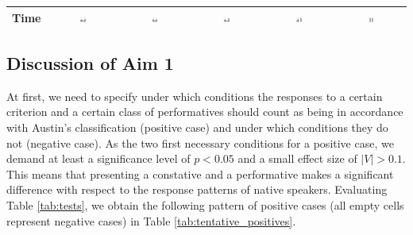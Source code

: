 \documentclass[egregdoesnotlikesansseriftitles,12pt]{scrartcl}
\begin{document}
\begin{landscape}
\begin{table}[]
{\begin{tabular}{lccccc}
Time         & \includegraphics[width=0.1\textwidth]{figures/beha_5.pdf}   & \includegraphics[width=0.1\textwidth]{figures/verd_5.pdf}   & \includegraphics[width=0.1\textwidth]{figures/exer_5.pdf}   & \includegraphics[width=0.1\textwidth]{figures/comm_5.pdf}   & \includegraphics[width=0.1\textwidth]{figures/expo_5.pdf}   \\
\hline
\end{tabular}}
\label{fig:bars}
\end{table}
\end{landscape}


\subsection{Discussion of Aim 1}
At first, we need to specify under which conditions the responses to a certain criterion and a certain class of performatives should count as being in accordance with Austin's classification (positive case) and under which conditions they do not (negative case). As the two first necessary conditions for a positive case, we demand at least a significance level of $p<0.05$ and a small effect size of $|V|>0.1$. This means that presenting a constative and a performative makes a significant difference with respect to the response patterns of native speakers. Evaluating Table \ref{tab:tests}, we obtain the following pattern of positive cases (all empty cells represent negative cases) in Table \ref{tab:tentative_positives}.
\end{document}
